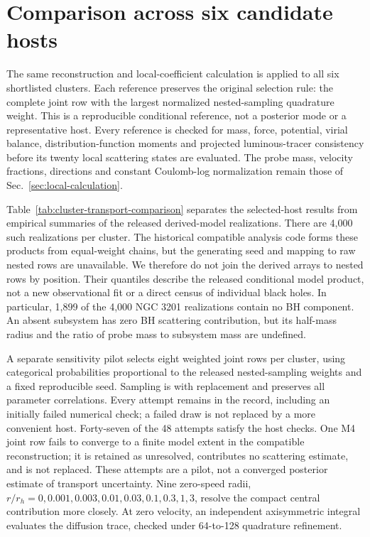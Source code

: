 \documentclass[aps,prd,reprint,amsmath,amssymb,superscriptaddress,nofootinbib,longbibliography,floatfix]{revtex4-2}
\begin{document}
\section{Comparison across six candidate hosts}\label{sec:cluster-comparison}

The same reconstruction and local-coefficient calculation is applied to all six shortlisted clusters. Each reference preserves the original selection rule: the complete joint row with the largest normalized nested-sampling quadrature weight. This is a reproducible conditional reference, not a posterior mode or a representative host. Every reference is checked for mass, force, potential, virial balance, distribution-function moments and projected luminous-tracer consistency before its twenty local scattering states are evaluated. The probe mass, velocity fractions, directions and constant Coulomb-log normalization remain those of Sec.~\ref{sec:local-calculation}.



Table~\ref{tab:cluster-transport-comparison} separates the selected-host results from empirical summaries of the released derived-model realizations. There are 4,000 such realizations per cluster. The historical compatible analysis code forms these products from equal-weight chains, but the generating seed and mapping to raw nested rows are unavailable. We therefore do not join the derived arrays to nested rows by position. Their quantiles describe the released conditional model product, not a new observational fit or a direct census of individual black holes. In particular, 1,899 of the 4,000 NGC 3201 realizations contain no BH component. An absent subsystem has zero BH scattering contribution, but its half-mass radius and the ratio of probe mass to subsystem mass are undefined.

A separate sensitivity pilot selects eight weighted joint rows per cluster, using categorical probabilities proportional to the released nested-sampling weights and a fixed reproducible seed. Sampling is with replacement and preserves all parameter correlations. Every attempt remains in the record, including an initially failed numerical check; a failed draw is not replaced by a more convenient host. Forty-seven of the 48 attempts satisfy the host checks. One M4 joint row fails to converge to a finite model extent in the compatible reconstruction; it is retained as unresolved, contributes no scattering estimate, and is not replaced. These attempts are a pilot, not a converged posterior estimate of transport uncertainty. Nine zero-speed radii, $r/r_h=0,0.001,0.003,0.01,0.03,0.1,0.3,1,3$, resolve the compact central contribution more closely. At zero velocity, an independent axisymmetric integral evaluates the diffusion trace, checked under 64-to-128 quadrature refinement.
\end{document}

